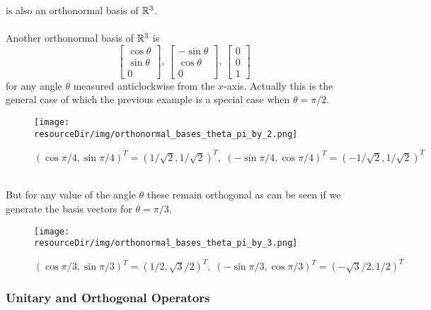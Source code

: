 \documentclass[../MathsNotesBase.tex]{subfiles}
\begin{document}
{		is also an orthonormal basis of $\mathbb{R}^{3}$.\\\\
		Another orthonormal basis of $\mathbb{R}^{3}$ is
		\[ \begin{bmatrix}\cos\theta\\\sin\theta\\0\end{bmatrix},\, \begin{bmatrix}-\sin\theta\\\cos\theta\\0\end{bmatrix},\, \begin{bmatrix}0\\0\\1\end{bmatrix} \]
		for any angle $\theta$ measured anticlockwise from the $x$-axis. Actually this is the general case of which the previous example is a special case when ${ \theta = \pi / 2 }$.
		\pagebreak	
		\begin{figure}[h!]
			\texttt{[image: \\resourceDir/img/orthonormal\_bases\_theta\_pi\_by\_2.png]}
			\caption{$ (\cos{\pi/4}, \sin{\pi/4})^T = (1/\sqrt{2}, 1/\sqrt{2})^T,\;  (-\sin{\pi/4}, \cos{\pi/4})^T = (-1/\sqrt{2}, 1/\sqrt{2})^T $}
		\end{figure}
		\\But for any value of the angle $\theta$ these remain orthogonal as can be seen if we generate the basis vectors for ${ \theta = \pi/3 }$.
		\begin{figure}[h!]
			\texttt{[image: \\resourceDir/img/orthonormal\_bases\_theta\_pi\_by\_3.png]}
			\caption{$ (\cos{\pi/3}, \sin{\pi/3})^T = (1/2, \sqrt{3}/2)^T,\;  (-\sin{\pi/3}, \cos{\pi/3})^T = (-\sqrt{3}/2, 1/2)^T $}
		\end{figure}
		\clearpage
		
		
		\subsubsection{Unitary and Orthogonal Operators}
		\bigskip
		
}
\end{document}
